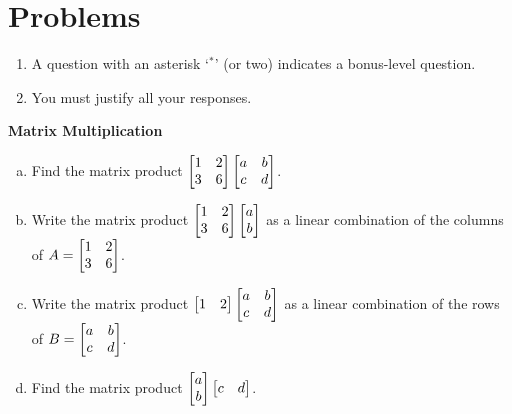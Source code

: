 \section*{Problems}

\begin{enumerate}
\item A question with an asterisk `$ ^\ast$' (or two) indicates a bonus-level question.
 \item You must justify all your responses.  
\end{enumerate}
\bigskip

\centerline{\bf  {Matrix Multiplication}} 
 \begin{prob} \label{prob14.1}
\begin{enumerate}[a)]
\item Find the matrix product $\bmatrix 1&
2\\ 3&6\endbmatrix \bmatrix a&b\\ c&d\endbmatrix$.
\medskip
%
\item\sov Write the matrix product $\bmatrix 1&
2\\ 3&6\endbmatrix \bmatrix a\\ b\endbmatrix$ as a linear combination of the columns of $A=\bmatrix 1&
2\\ 3&6\endbmatrix$.
\medskip
%
\item Write the matrix product $\bmatrix 1&
2\endbmatrix \bmatrix a&b\\ c&d\endbmatrix$ as a linear combination of the rows of $B=\bmatrix a&b\\ c&d\endbmatrix$.
\medskip
%
\item\sov  Find the matrix product $\bmatrix a \\ b \endbmatrix \bmatrix c&d \endbmatrix$.
\medskip
%


\end{enumerate}
\end{prob}
